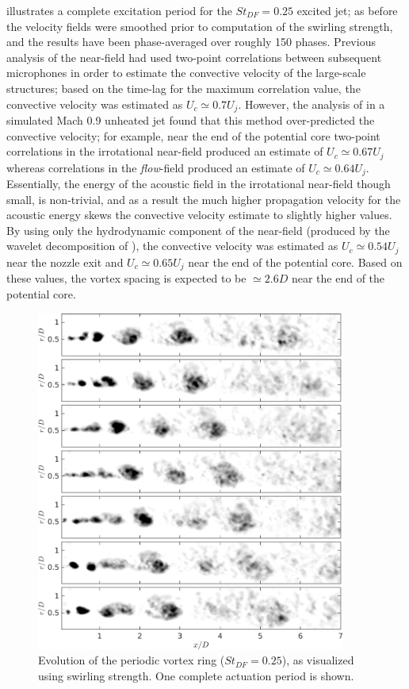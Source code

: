 illustrates a complete excitation period for the $St_{DF} = 0.25$ excited jet; as before the velocity fields were smoothed prior to computation of the swirling strength, and the results have been phase-averaged over roughly 150 phases.
Previous analysis of the near-field had used two-point correlations between subsequent microphones in order to estimate the convective velocity of the large-scale structures; based on the time-lag for the maximum correlation value, the convective velocity was estimated as $U_c \simeq 0.7 U_j$.
However, the analysis of \citet{Speth2015} in a simulated Mach 0.9 unheated jet found that this method over-predicted the convective velocity; for example, near the end of the potential core two-point correlations in the irrotational near-field produced an estimate of $U_c \simeq 0.67 U_j$ whereas correlations in the \textit{flow}-field produced an estimate of $U_c \simeq 0.64 U_j$.
Essentially, the energy of the acoustic field in the irrotational near-field though small, is non-trivial, and as a result the much higher propagation velocity for the acoustic energy skews the convective velocity estimate to slightly higher values.
By using only the hydrodynamic component of the near-field (produced by the wavelet decomposition of \citet{Crawley2016}), the convective velocity was estimated as $U_c \simeq 0.54 U_j$ near the nozzle exit and $U_c \simeq 0.65 U_j$ near the end of the potential core.
Based on these values, the vortex spacing is expected to be $\simeq 2.6D$ near the end of the potential core.
\begin{figure}
	\centering
	\includegraphics[width=4in]{Figures/ch4_St025_lambda.png}
	\caption{Evolution of the periodic vortex ring ($St_{DF}=0.25$), as visualized using swirling strength. One complete actuation period is shown.}
	\label{fig:ch4_period_structure_disintegration}
\end{figure}

